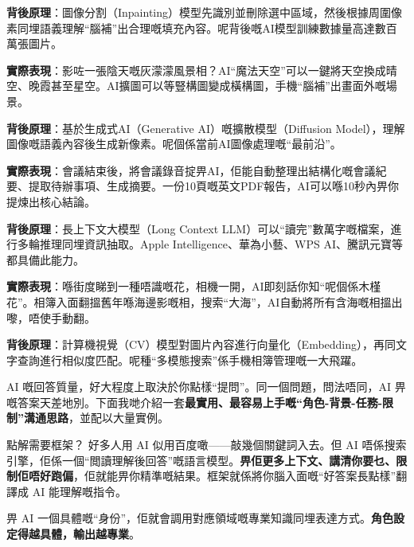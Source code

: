 \textbf{背後原理}：圖像分割（Inpainting）模型先識別並刪除選中區域，然後根據周圍像素同埋語義理解“腦補”出合理嘅填充內容。呢背後嘅AI模型訓練數據量高達數百萬張圖片。


\textbf{實際表現}：影咗一張陰天嘅灰濛濛風景相？AI“魔法天空”可以一鍵將天空換成晴空、晚霞甚至星空。AI擴圖可以等豎構圖變成橫構圖，手機“腦補”出畫面外嘅場景。

\textbf{背後原理}：基於生成式AI（Generative AI）嘅擴散模型（Diffusion Model），理解圖像嘅語義內容後生成新像素。呢個係當前AI圖像處理嘅“最前沿”。


\textbf{實際表現}：會議結束後，將會議錄音掟畀AI，佢能自動整理出結構化嘅會議紀要、提取待辦事項、生成摘要。一份10頁嘅英文PDF報告，AI可以喺10秒內畀你提煉出核心結論。

\textbf{背後原理}：長上下文大模型（Long Context LLM）可以“讀完”數萬字嘅檔案，進行多輪推理同埋資訊抽取。Apple Intelligence、華為小藝、WPS AI、騰訊元寶等都具備此能力。


\textbf{實際表現}：喺街度睇到一種唔識嘅花，相機一開，AI即刻話你知“呢個係木槿花”。相簿入面翻搵舊年喺海邊影嘅相，搜索“大海”，AI自動將所有含海嘅相搵出嚟，唔使手動翻。

\textbf{背後原理}：計算機視覺（CV）模型對圖片內容進行向量化（Embedding），再同文字查詢進行相似度匹配。呢種“多模態搜索”係手機相簿管理嘅一大飛躍。


AI 嘅回答質量，好大程度上取決於你點樣“提問”。同一個問題，問法唔同，AI 畀嘅答案天差地別。下面我哋介紹一套\textbf{最實用、最容易上手嘅“角色-背景-任務-限制”溝通思路}，並配以大量實例。

\begin{tcbinfo}{點解需要框架？}
好多人用 AI 似用百度噉——敲幾個關鍵詞入去。但 AI 唔係搜索引擎，佢係一個“閲讀理解後回答”嘅語言模型。\textbf{畀佢更多上下文、講清你要乜、限制佢唔好跑偏}，佢就能畀你精準嘅結果。框架就係將你腦入面嘅“好答案長點樣”翻譯成 AI 能理解嘅指令。

\end{tcbinfo}


畀 AI 一個具體嘅“身份”，佢就會調用對應領域嘅專業知識同埋表達方式。\textbf{角色設定得越具體，輸出越專業}。

